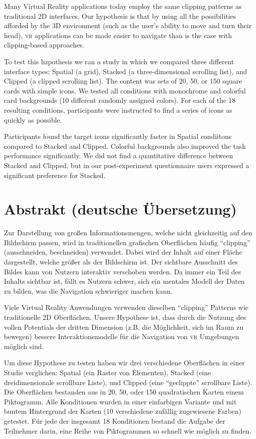\documentclass[nobib]{tufte-book} %
\begin{document}
Many Virtual Reality applications today employ the same clipping patterns as traditional 2D interfaces. Our hypothesis is that by using all the possibilities afforded by the 3D environment (such as the user's ability to move and turn their head), \textsc{vr} applications can be made easier to navigate than is the case with clipping-based approaches.

To test this hzpothesis we ran a study in which we compared three different interface types: Spatial (a grid), Stacked (a three-dimensional scrolling list), and Clipped (a clipped scrolling list). The content was sets of 20, 50, or 150 square cards with simple icons. We tested all conditions with monochrome and colorful card backgrounds (10 different randomly assigned colors). For each of the 18 resulting conditions, participants were instructed to find a series of icons as quickly as possible.

Participants found the target icons significantly faster in Spatial condiitons compared to Stacked and Clipped. Colorful backgrounds also improved the task performance significantly. We did not find a quantitative difference between Stacked and Clipped, but in our post-experiment questionnaire users expressed a significant preference for Stacked.

\newpage

\section{Abstrakt (deutsche {\"U}bersetzung)}
Zur Darstellung von gro{\ss}en Informationsmengen, welche nicht gleichzeitig auf den Bildschirm passen, wird in traditionellen grafischen Oberfl{\"a}chen h{\"a}ufig ``clipping'' (ausschneiden, beschneiden) verwendet. Dabei wird der Inhalt auf einer Fl{\"a}che dargestellt, welche gr{\"o}{\ss}er als der Bildschirm ist. Der sichtbare Ausschnitt des Bildes kann von Nutzern interaktiv verschoben werden. Da immer ein Teil des Inhalts sichtbar ist, f{\"a}llt es Nutzern schwer, sich ein mentales Modell der Daten zu bilden, was die Navigation schwieriger machen kann.

Viele Virtual Reality Anwendungen verwenden dieselben ``clipping'' Patterns wie traditionelle 2D Oberfl{\"a}chen. Unsere Hypothese ist, dass durch die Nutzung des vollen Potentials der dritten Dimension (z.B. die M{\"o}glichkeit, sich im Raum zu bewegen) bessere Interaktionsmodelle f{\"u}r die Navigation von \textsc{vr} Umgebungen m{\"o}glich sind.

Um diese Hypothese zu testen haben wir drei verschiedene Oberfl{\"a}chen in einer Studie verglichen: Spatial (ein Raster von Elementen), Stacked (eine dreidimensionale scrollbare Liste), und Clipped (eine ``geclippte'' scrollbare Liste). Die Oberfl{\"a}chen bestanden aus in 20, 50, oder 150 quadratischen Karten einem Piktogramm. Alle Konditionen wurden in einer einfarbigen Variante und mit buntem Hintergrund der Karten (10 verschiedene zuf{\"a}llig zugewiesene Farben) getestet. F{\"u}r jede der insgesamt 18 Konditionen bestand die Aufgabe der Teilnehmer darin, eine Reihe von Piktogrammen so schnell wie m{\"o}glich zu finden.
\end{document}
